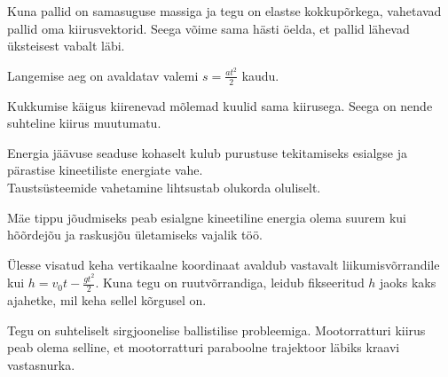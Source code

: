 \documentclass[10pt, twoside]{article}
\begin{document}
{
\hint
Kuna pallid on samasuguse massiga ja tegu on elastse kokkupõrkega, vahetavad pallid oma kiirusvektorid. Seega võime sama hästi öelda, et pallid lähevad üksteisest vabalt läbi.
\probend
\bigskip


\hint
Langemise aeg on avaldatav valemi $s = \frac{at^2}{2}$ kaudu.
\probend
\bigskip


\hint
Kukkumise käigus kiirenevad mõlemad kuulid sama kiirusega. Seega on nende suhteline kiirus muutumatu.
\probend
\bigskip


\hint
\osa Energia jäävuse seaduse kohaselt kulub purustuse tekitamiseks esialgse ja pärastise kineetiliste energiate vahe.\\
\osa Taustsüsteemide vahetamine lihtsustab olukorda oluliselt.
\probend
\bigskip


\hint
Mäe tippu jõudmiseks peab esialgne kineetiline energia olema suurem kui hõõrdejõu ja raskusjõu ületamiseks vajalik töö.
\probend
\bigskip


\hint
Ülesse visatud keha vertikaalne koordinaat avaldub vastavalt liikumisvõrrandile kui $h = v_0t - \frac{gt^2}{2}$. Kuna tegu on ruutvõrrandiga, leidub fikseeritud $h$ jaoks kaks ajahetke, mil keha sellel kõrgusel on.
\probend
\bigskip


\hint
Tegu on suhteliselt sirgjoonelise ballistilise probleemiga. Mootorratturi kiirus peab olema selline, et mootorratturi paraboolne trajektoor läbiks kraavi vastasnurka.
\probend
\bigskip

}
\end{document}
